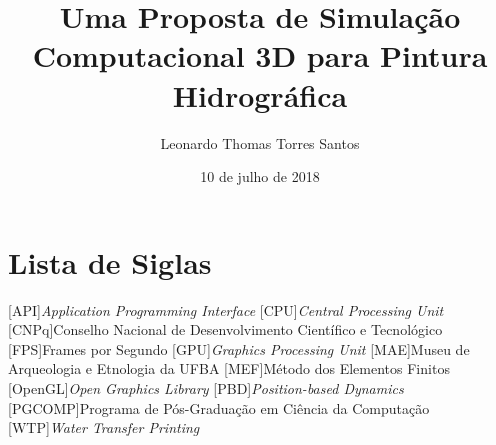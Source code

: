 \documentclass[qual, classic, a4paper]{ufbathesis}
\institute{Instituto de Matem\'{a}tica}
\title{Uma Proposta de Simula\c{c}\~{a}o Computacional 3D para Pintura Hidrogr\'{a}fica}
\date{10 de julho de 2018}
\author{Leonardo Thomas Torres Santos}
\begin{document}
\pgcompfrontpage

\frontmatter

\pgcomppresentationpage







\tableofcontents

\listoffigures

\listoftables

\chapter*{Lista de Siglas}

\begin{acronym}[PGCOMP]
     [API]{\textit{Application Programming Interface}}
     [CPU]{\textit{Central Processing Unit}}
     [CNPq]{Conselho Nacional de Desenvolvimento Científico e Tecnológico}
     [FPS]{Frames por Segundo}
     [GPU]{\textit{Graphics Processing Unit}}
     [MAE]{Museu de Arqueologia e Etnologia da UFBA}
     [MEF]{Método dos Elementos Finitos}
     [OpenGL]{\textit{Open Graphics Library}}
     [PBD]{\textit{Position-based Dynamics}}
     [PGCOMP]{Programa de Pós-Graduação em Ciência da Computação}
     [WTP]{\textit{Water Transfer Printing}}
\end{acronym}

\mainmatter

% 
% 
% 
%
\end{document}
